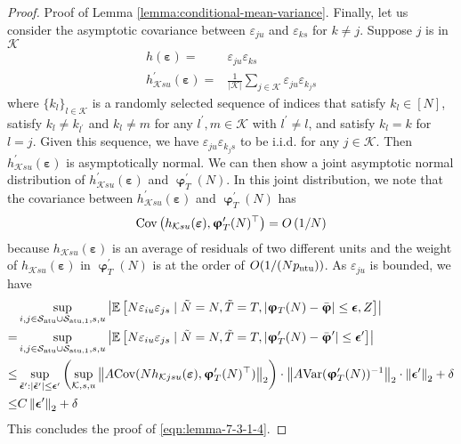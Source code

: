 \begin{proof}{Proof of Lemma \ref{lemma:conditional-mean-variance}.}
Finally, let us consider the asymptotic covariance between $\varepsilon_{ju}$ and $\varepsilon_{ks}$ for $k \neq j$. Suppose $j$ is in $\mathcal{K}$
\begin{align*}
    h(\bm{\varepsilon}) =& \varepsilon_{ju}\varepsilon_{ks} \\
    h^\prime_{\mathcal{K}su}(\bm{\varepsilon}) =& \frac{1}{|\mathcal{K}|} \sum_{j \in \mathcal{K}}  \varepsilon_{ju}\varepsilon_{k_j s}
\end{align*}
where $\{k_l\}_{l \in \mathcal{K}}$ is a randomly selected sequence of indices that satisfy $k_l \in [N]$, satisfy $k_l \neq k_{l^\prime}$ and $k_l \neq m$ for any $l^\prime, m \in \mathcal{K}$ with $l^\prime \neq l$, and satisfy $k_l = k$ for $l = j$. Given this sequence, we have $\varepsilon_{ju}\varepsilon_{k_j s} $ to be i.i.d. for any $j \in \mathcal{K}$. Then $h^\prime_{\mathcal{K}su}(\bm{\varepsilon}) $ is asymptotically normal. We can then show a joint asymptotic normal distribution of $h^\prime_{\mathcal{K}su}(\bm{\varepsilon}) $ and $\bm{\upvarphi}^\prime_T(N)$. In this joint distribution, we note that the covariance between $h^\prime_{\mathcal{K}su}(\bm{\varepsilon}) $ and $\bm{\upvarphi}^\prime_T(N)$ has 
\[\mathrm{Cov} \left(h_{\mathcal{K}su}(\bm{\varepsilon}), \bm{\upvarphi}^\prime_T(N)^\top \right) = O \left({1}/{N} \right) \]
because $h_{\mathcal{K}su}(\bm{\varepsilon})$ is an average of residuals of two different units and the weight of $h_{\mathcal{K}su}(\bm{\varepsilon})$ in $\bm{\upvarphi}^\prime_T(N)$ is at the order of $O(1/(N p_{\mathrm{ntu}}))$. As $\varepsilon_{ju}$ is bounded, we have 
\begin{align*}
    & \sup_{i,j \in \mathcal{S}_{\mathrm{ntu}} \cup \mathcal{S}_{\mathrm{atu},1},s,u} \left|\mathbb{E}\left[N\varepsilon_{iu} \varepsilon_{js}  \mid \tilde{N} = N, \tilde{T} = T, |\bm{\upvarphi}_T(N) - \bar{\bm{\upvarphi}}| \leq {\bm{\epsilon}}, Z \right]\right| \\
    =& \sup_{i,j \in \mathcal{S}_{\mathrm{ntu}} \cup \mathcal{S}_{\mathrm{atu},1},s,u} \left|\mathbb{E}\left[N\varepsilon_{iu} \varepsilon_{js}  \mid \tilde{N} = N, \tilde{T} = T, |\bm{\upvarphi}^\prime_T(N) - \bar{\bm{\upvarphi}}^\prime| \leq {\bm{\epsilon}}^\prime \right]\right| \\
    \leq& \sup_{\tilde{\bm{\epsilon}}^\prime: |\tilde{\bm{\epsilon}}^\prime| \leq \bm{\epsilon}^\prime} \left(\sup_{\mathcal{K},s,u}  \left\lVert A\mathrm{Cov} (Nh_{\mathcal{K}jsu}(\bm{\varepsilon}), \bm{\upvarphi}^\prime_T(N)^\top)\right\rVert_2 \right) \cdot \left\lVert A\mathrm{Var}(\bm{\upvarphi}^\prime_T(N))^{-1}\right\rVert_2 \cdot \left\lVert\bm{\epsilon}^\prime\right\rVert_2 + {\delta}   \\
    \leq& C \left\lVert\bm{\epsilon}^\prime\right\rVert_2 + \delta 
\end{align*}
This concludes the proof of \eqref{eqn:lemma-7-3-1-4}. 



\end{proof}
